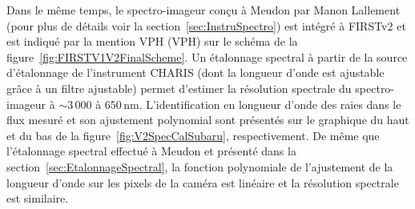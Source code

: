 Dans le même temps, le spectro-imageur conçu à Meudon par Manon Lallement (pour plus de détails voir la section~\ref{sec:InstruSpectro}) est intégré à \ac{FIRSTv2} et est indiqué par la mention \acrshort{VPH} (\acrlong{VPH}) sur le schéma de la figure~\ref{fig:FIRSTV1V2FinalScheme}. Un étalonnage spectral à partir de la source d'étalonnage de l'instrument \ac{CHARIS} (dont la longueur d'onde est ajustable grâce à un filtre ajustable) permet d'estimer la résolution spectrale du spectro-imageur à $\sim 3\,000$ à $650 \,$nm. L'identification en longueur d'onde des raies dans le flux mesuré et son ajustement polynomial sont présentés sur le graphique du haut et du bas de la figure~\ref{fig:V2SpecCalSubaru}, respectivement. De même que l'étalonnage spectral effectué à Meudon et présenté dans la section~\ref{sec:EtalonnageSpectral}, la fonction polynomiale de l'ajustement de la longueur d'onde sur les pixels de la caméra est linéaire et la résolution spectrale est similaire.

